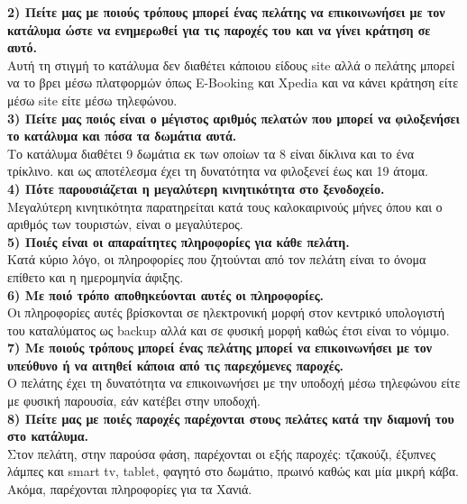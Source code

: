 \noindent
\textbf{2) Πείτε μας με ποιούς τρόπους μπορεί ένας πελάτης να επικοινωνήσει
	με τον κατάλυμα ώστε να ενημερωθεί για τις παροχές του και να γίνει κράτηση
	σε αυτό.} \\
\noindent
Αυτή τη στιγμή το κατάλυμα δεν διαθέτει κάποιου είδους site αλλά ο πελάτης
μπορεί να το βρει μέσω πλατφορμών όπως 	E-Booking και Xpedia και να κάνει
κράτηση είτε μέσω site είτε μέσω τηλεφώνου. \\
  
\noindent
\textbf{3) Πείτε μας ποιός είναι ο μέγιστος αριθμός πελατών που μπορεί να φιλοξενήσει 
	το κατάλυμα και πόσα τα δωμάτια αυτά.} \\
\noindent
Το κατάλυμα διαθέτει 9 δωμάτια εκ των οποίων τα 8 είναι δίκλινα και το ένα τρίκλινο.
και ως αποτέλεσμα έχει τη δυνατότητα να φιλοξενεί έως και 19 άτομα.\\

\noindent
\textbf{4) Πότε παρουσιάζεται η μεγαλύτερη κινητικότητα στο ξενοδοχείο.} \\
\noindent
Μεγαλύτερη κινητικότητα παρατηρείται κατά τους καλοκαιρινούς μήνες όπου 
και ο αριθμός των τουριστών, είναι ο μεγαλύτερος.\\

\noindent
\textbf{5) Ποιές είναι οι απαραίτητες πληροφορίες για κάθε πελάτη.} \\
\noindent
Κατά κύριο λόγο, οι πληροφορίες που ζητούνται από τον πελάτη είναι 
το όνομα επίθετο και η ημερομηνία άφιξης. \\

\noindent
\textbf{6) Με ποιό τρόπο αποθηκεύονται αυτές οι πληροφορίες.} \\
\noindent
Οι πληροφορίες αυτές βρίσκονται σε ηλεκτρονική μορφή στον κεντρικό υπολογιστή
του καταλύματος ως backup αλλά και σε φυσική μορφή καθώς έτσι είναι το νόμιμο. \\

\noindent
\textbf{7) Με ποιούς τρόπους μπορεί ένας πελάτης μπορεί  να επικοινωνήσει 
	με τον υπεύθυνο ή να αιτηθεί κάποια από τις παρεχόμενες παροχές.} \\
\noindent
Ο πελάτης έχει τη δυνατότητα να επικοινωνήσει με την υποδοχή μέσω τηλεφώνου
είτε με φυσική παρουσία, εάν κατέβει στην υποδοχή.\\

\noindent
\textbf{8) Πείτε μας με ποιές παροχές παρέχονται στους πελάτες κατά την διαμονή 
	του στο κατάλυμα.} \\
\noindent
Στον πελάτη, στην παρούσα φάση, παρέχονται οι εξής παροχές: τζακούζι,  έξυπνες λάμπες
και smart tv, tablet, φαγητό στο δωμάτιο, πρωινό  καθώς και μία μικρή κάβα. Ακόμα,
παρέχονται πληροφορίες για τα Χανιά.\\

